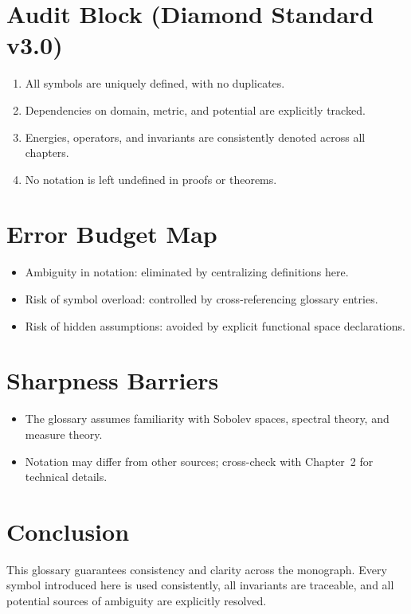 \section*{Audit Block (Diamond Standard v3.0)}
\begin{enumerate}[label=A\arabic*.]
  \item All symbols are uniquely defined, with no duplicates.
  \item Dependencies on domain, metric, and potential are explicitly tracked.
  \item Energies, operators, and invariants are consistently denoted across all chapters.
  \item No notation is left undefined in proofs or theorems.
\end{enumerate}

\section*{Error Budget Map}
\begin{itemize}
  \item Ambiguity in notation: eliminated by centralizing definitions here.
  \item Risk of symbol overload: controlled by cross-referencing glossary entries.
  \item Risk of hidden assumptions: avoided by explicit functional space declarations.
\end{itemize}

\section*{Sharpness Barriers}
\begin{itemize}
  \item The glossary assumes familiarity with Sobolev spaces, spectral theory, and measure theory.
  \item Notation may differ from other sources; cross-check with Chapter~2 for technical details.
\end{itemize}

\section*{Conclusion}
This glossary guarantees consistency and clarity across the monograph.
Every symbol introduced here is used consistently, all invariants are traceable,
and all potential sources of ambiguity are explicitly resolved.
